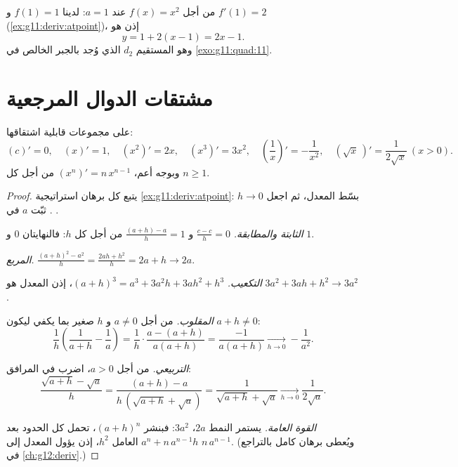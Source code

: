 \begin{example}\label{ex:g11:deriv:tangenteq}
من أجل $f(x) = x^2$ عند $a = 1$: لدينا $f(1) = 1$ و $f'(1) = 2$
(\cref{ex:g11:deriv:atpoint})، إذن  هو
\[
y = 1 + 2(x - 1) = 2x - 1 .
\]
وهو المستقيم $d_2$ الذي وُجد بالجبر الخالص في \cref{exo:g11:quad:11}.
\end{example}

\section{مشتقات الدوال المرجعية}

\begin{proposition}\label{prop:g11:deriv:refderivatives}
على مجموعات قابلية اشتقاقها:
\[
(c)' = 0, \quad
(x)' = 1, \quad
(x^2)' = 2x, \quad
(x^3)' = 3x^2, \quad
\left(\frac1x\right)' = -\frac{1}{x^2}, \quad
(\sqrt x\,)' = \frac{1}{2\sqrt x} \ (x > 0).
\]
وبوجه أعم، $(x^n)' = n\,x^{n-1}$ من أجل كل  $n \geq 1$.
\end{proposition}

\begin{proof}
يتبع كل برهان استراتيجية \cref{ex:g11:deriv:atpoint}: بسّط
المعدل، ثم اجعل $h \to 0$. ثبّت $a$ في .

\emph{الثابتة والمطابقة.} $\frac{c - c}{h} = 0$ و
$\frac{(a+h) - a}{h} = 1$ من أجل كل $h$: فالنهايتان $0$ و $1$.

\emph{المربع.} $\frac{(a+h)^2 - a^2}{h} = \frac{2ah + h^2}{h} = 2a + h
\to 2a$.

\emph{التكعيب.} $(a+h)^3 = a^3 + 3a^2h + 3ah^2 + h^3$، إذن المعدل هو
$3a^2 + 3ah + h^2 \to 3a^2$.

\emph{المقلوب.} من أجل $a \neq 0$ و $h$ صغير بما يكفي ليكون
$a + h \neq 0$:
\[
\frac{1}{h}\left(\frac{1}{a+h} - \frac{1}{a}\right)
= \frac{1}{h} \cdot \frac{a - (a+h)}{a(a+h)}
= \frac{-1}{a(a+h)}
\xrightarrow[h \to 0]{} -\frac{1}{a^2}.
\]

\emph{ التربيعي.} من أجل $a > 0$، اضرب في المرافق:
\[
\frac{\sqrt{a+h} - \sqrt a}{h}
= \frac{(a + h) - a}{h\,(\sqrt{a+h} + \sqrt a)}
= \frac{1}{\sqrt{a+h} + \sqrt a}
\xrightarrow[h \to 0]{} \frac{1}{2\sqrt a}.
\]

\emph{القوة العامة.} يستمر النمط $2a$، $3a^2$: فبنشر
$(a+h)^n$، تحمل كل الحدود بعد $a^n + n\,a^{n-1}h$ العامل $h^2$، إذن يؤول
المعدل إلى $n\,a^{n-1}$. (ويُعطى برهان كامل بالتراجع في
\cref{ch:g12:deriv}.)
\end{proof}

